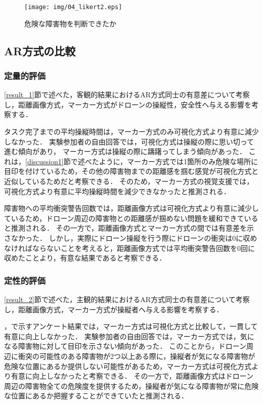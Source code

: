 \documentclass[submit, sigrecommended]{ipsj}
\begin{document}
    \begin{figure}[tb]
      \centering
      \texttt{[image: img/04\_likert2.eps]}
      \caption{危険な障害物を判断できたか}
      \label{fig:04_likert2}
      \end{figure}
      


\subsection{AR方式の比較}
\subsubsection{定量的評価}
\ref{result_1}節で述べた，客観的結果におけるAR方式同士の有意差について考察し，距離画像方式，マーカー方式がドローンの操縦性，安全性へ与える影響を考察する．
\par
タスク完了までの平均操縦時間は，マーカー方式のみ可視化方式より有意に減少しなかった．
実験参加者の自由回答では，可視化方式は操縦の際に思い切って進む傾向があり，
マーカー方式は操縦の際に躊躇ってしまう傾向があった．
これは，\ref{discussion1}節で述べたように，マーカー方式では1箇所のみ危険な場所に目印を付けているため，その他の障害物までの距離感を掴む感覚が可視化方式と近似しているためだと考察できる．
そのため，マーカー方式の視覚支援では，可視化方式より有意に平均操縦時間を減少できなかったと推測される．
\par
障害物への平均衝突警告回数では，距離画像方式は可視化方式より有意に減少しているため，ドローン周辺の障害物との距離感が掴めない問題を緩和できていると推測される．
その一方で，距離画像方式とマーカー方式の間では有意差を示さなかった．
しかし，実際にドローン操縦を行う際にドローンの衝突は0に収めなければならないことを考えると，距離画像方式では平均衝突警告回数を0回に収めたことより，有意な結果であると考察できる．

\subsubsection{定性的評価}
\ref{result_2}節で述べた，主観的結果におけるAR方式同士の有意差について考察し，距離画像方式，マーカー方式が操縦者へ与える影響を考察する．
\par
{}，で示すアンケート結果では，マーカー方式は可視化方式と比較して，一貫して有意に向上しなかった．
実験参加者の自由回答では，マーカー方式では，気になる障害物に対して目印を示さない傾向があった．
このことから，ドローン周辺に衝突の可能性のある障害物が2つ以上ある際に，操縦者が気になる障害物が危険な位置にあるか提供しない可能性があるため，マーカー方式は可視化方式より有意に向上しなかったと考察できる．
その一方で，距離画像方式はドローン周辺の障害物全ての危険度を提供するため，操縦者が気になる障害物が常に危険な位置にあるか把握することができていたと推測される．
\end{document}
